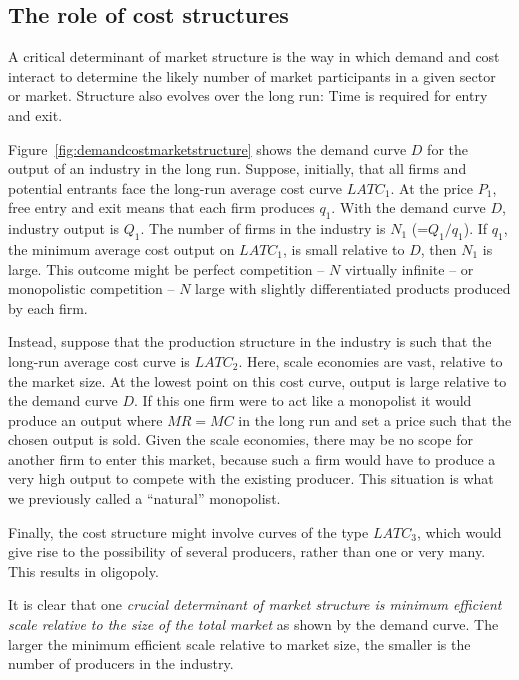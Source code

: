 \subsection*{The role of cost structures}

A critical determinant of market structure is the way in which demand and cost interact to determine the likely number of market participants in a given sector or market. Structure also evolves over the long run: Time is required for entry and exit.

Figure~\ref{fig:demandcostmarketstructure} shows the demand curve $D$ for the output of an industry in the long run. Suppose, initially, that all firms and potential entrants face the long-run average cost curve $LATC_1$. At the price $P_1$, free entry and exit means that each firm produces $q_1$. With the demand curve $D$, industry output is $Q_1$. The number of firms in the industry is $N_1$ (=$Q_1/q_1$). If $q_1$, the minimum average cost output on $LATC_1$, is small relative to $D$, then $N_1$ is large. This outcome might be perfect competition -- $N$ virtually infinite -- or monopolistic competition -- $N$ large with slightly differentiated products produced by each firm.



Instead, suppose that the production structure in the industry is such that the long-run average cost curve is $LATC_2$. Here, scale economies are vast, relative to the market size. At the lowest point on this cost curve, output is large relative to the demand curve $D$. If this one firm were to act like a monopolist it would produce an output where $MR=MC$ in the long run and set a price such that the chosen output is sold. Given the scale economies, there may be no scope for another firm to enter this market, because such a firm would have to produce a very high output to compete with the existing producer. This situation is what we previously called a ``natural'' monopolist.

Finally, the cost structure might involve curves of the type $LATC_3$, which would give rise to the possibility of several producers, rather than one or very many. This results in oligopoly.

It is clear that one \textit{crucial determinant of market structure is minimum efficient scale relative to the size of the total market} as shown by the demand curve. The larger the minimum efficient scale relative to market size, the smaller is the number of producers in the industry.